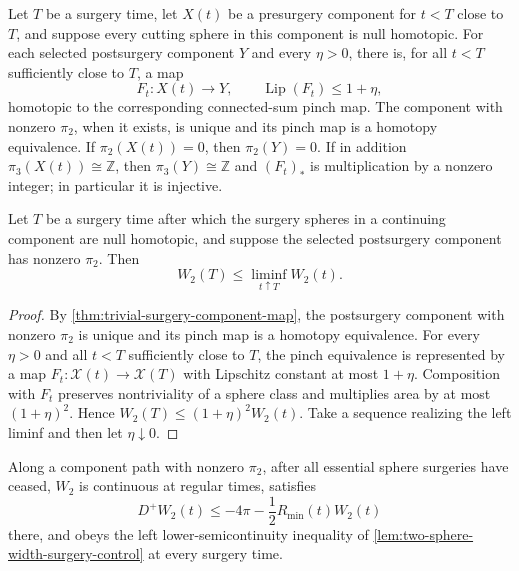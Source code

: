\begin{theorem}
\label{thm:trivial-surgery-component-map}
\notready
Let $T$ be a surgery time, let $X(t)$ be a presurgery component for $t<T$
close to $T$, and suppose every cutting sphere in this component is null
homotopic.  For each selected postsurgery component $Y$ and every $\eta>0$,
there is, for all $t<T$ sufficiently close to $T$, a map
\[
 F_t\colon X(t)\longrightarrow Y,
 \qquad \operatorname{Lip}(F_t)\le1+\eta,
\]
homotopic to the corresponding connected-sum pinch map.  The component with
nonzero $\pi_2$, when it exists, is unique and its pinch map is a homotopy
equivalence.  If $\pi_2(X(t))=0$, then $\pi_2(Y)=0$.  If in addition
$\pi_3(X(t))\cong\mathbb Z$, then $\pi_3(Y)\cong\mathbb Z$ and $(F_t)_*$ is
multiplication by a nonzero integer; in particular it is injective.
\end{theorem}

\begin{lemma}
\label{lem:two-sphere-width-surgery-control}
\notready
Let $T$ be a surgery time after which the surgery spheres in a continuing
component are null homotopic, and suppose the selected postsurgery component
has nonzero $\pi_2$.  Then
\[
 W_2(T)\le\liminf_{t\uparrow T}W_2(t).
\]
\end{lemma}

\begin{proof}
By \ref{thm:trivial-surgery-component-map}, the postsurgery component with
nonzero $\pi_2$ is unique and its pinch map is a homotopy equivalence.  For
every $\eta>0$ and all
$t<T$ sufficiently close to $T$, the pinch equivalence is represented by a
map $F_t\colon\mathcal X(t)\to\mathcal X(T)$ with Lipschitz constant at most
$1+\eta$.  Composition with $F_t$ preserves nontriviality of
a sphere class and multiplies area by at most $(1+\eta)^2$.  Hence
$W_2(T)\le(1+\eta)^2W_2(t)$.  Take a sequence realizing the left liminf and
then let $\eta\downarrow0$.
\end{proof}

\begin{lemma}
\label{lem:two-sphere-width-forward-inequality}
\notready
Along a component path with nonzero $\pi_2$, after all essential sphere
surgeries have ceased, $W_2$ is continuous at regular times, satisfies
\[
 D^+W_2(t)\le-4\pi-\frac12R_{\min}(t)W_2(t)
\]
there, and obeys the left lower-semicontinuity inequality of
\ref{lem:two-sphere-width-surgery-control} at every surgery time.
\end{lemma}

